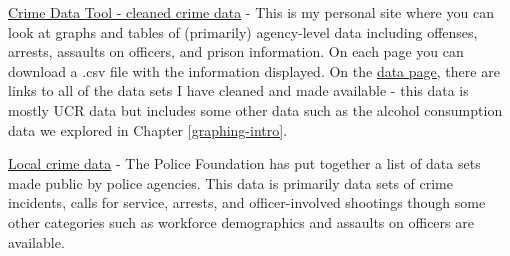 \documentclass[
  12pt,
]{book}
\begin{document}
\href{http://jacobdkaplan.com/data}{Crime Data Tool - cleaned crime data} - This is my personal site where you can look at graphs and tables of (primarily) agency-level data including offenses, arrests, assaults on officers, and prison information. On each page you can download a .csv file with the information displayed. On the \href{http://jacobdkaplan.com/data.html}{data page}, there are links to all of the data sets I have cleaned and made available - this data is mostly UCR data but includes some other data such as the alcohol consumption data we explored in Chapter \ref{graphing-intro}.

\href{https://www.policedatainitiative.org/datasets/}{Local crime data} - The Police Foundation has put together a list of data sets made public by police agencies. This data is primarily data sets of crime incidents, calls for service, arrests, and officer-involved shootings though some other categories such as workforce demographics and assaults on officers are available.

  
\end{document}
